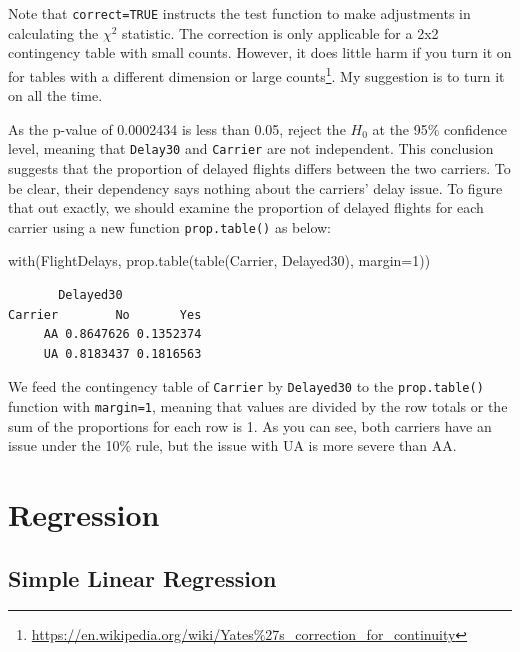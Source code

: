 \documentclass[
  letterpaper,
  DIV=11,
  numbers=noendperiod]{scrreprt}
\newenvironment{Shaded}{\begin{snugshade}}{\end{snugshade}}
\newcommand{\AttributeTok}[1]{\textcolor[rgb]{0.40,0.45,0.13}{#1}}
\newcommand{\DecValTok}[1]{\textcolor[rgb]{0.68,0.00,0.00}{#1}}
\newcommand{\FunctionTok}[1]{\textcolor[rgb]{0.28,0.35,0.67}{#1}}
\newcommand{\NormalTok}[1]{\textcolor[rgb]{0.00,0.23,0.31}{#1}}
\begin{document}
Note that \texttt{correct=TRUE} instructs the test function to make
adjustments in calculating the \(\chi^2\) statistic. The correction is
only applicable for a 2x2 contingency table with small counts. However,
it does little harm if you turn it on for tables with a different
dimension or large counts\footnote{\url{https://en.wikipedia.org/wiki/Yates\%27s_correction_for_continuity}}.
My suggestion is to turn it on all the time.

As the p-value of 0.0002434 is less than 0.05, reject the \(H_{0}\) at
the 95\% confidence level, meaning that \texttt{Delay30} and
\texttt{Carrier} are not independent. This conclusion suggests that the
proportion of delayed flights differs between the two carriers. To be
clear, their dependency says nothing about the carriers' delay issue. To
figure that out exactly, we should examine the proportion of delayed
flights for each carrier using a new function \texttt{prop.table()} as
below:

\begin{Shaded}
\begin{Highlighting}[]
\FunctionTok{with}\NormalTok{(FlightDelays, }\FunctionTok{prop.table}\NormalTok{(}\FunctionTok{table}\NormalTok{(Carrier, Delayed30), }\AttributeTok{margin=}\DecValTok{1}\NormalTok{))}
\end{Highlighting}
\end{Shaded}

\begin{verbatim}
       Delayed30
Carrier        No       Yes
     AA 0.8647626 0.1352374
     UA 0.8183437 0.1816563
\end{verbatim}

We feed the contingency table of \texttt{Carrier} by \texttt{Delayed30}
to the \texttt{prop.table()} function with \texttt{margin=1}, meaning
that values are divided by the row totals or the sum of the proportions
for each row is 1. As you can see, both carriers have an issue under the
10\% rule, but the issue with UA is more severe than AA.

\section{Regression}\label{regression}

\subsection{Simple Linear Regression}\label{sec-04-SLR}
\end{document}

